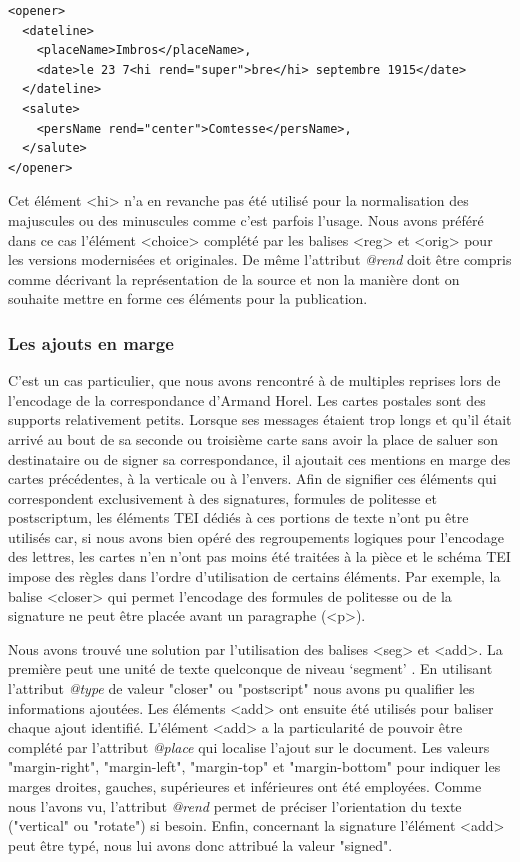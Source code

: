 \documentclass[12pt,a4paper]{book} %
\begin{document}
\begin{lstlisting}
<opener>
  <dateline>
    <placeName>Imbros</placeName>,
    <date>le 23 7<hi rend="super">bre</hi> septembre 1915</date>
  </dateline>
  <salute>
    <persName rend="center">Comtesse</persName>,
  </salute>
</opener>
\end{lstlisting}
\bigskip

Cet élément <hi> n'a en revanche pas été utilisé pour la normalisation des majuscules ou des minuscules comme c'est parfois l'usage. Nous avons préféré dans ce cas l'élément <choice> complété par les balises <reg> et <orig> pour les versions modernisées et originales. De même l'attribut \textit{@rend} doit être compris comme décrivant la représentation de la source et non la manière dont on souhaite  mettre en forme ces éléments pour la publication.

\subsubsection{Les ajouts en marge}

C'est un cas particulier, que nous avons rencontré à de multiples reprises lors de l'encodage de la correspondance d'Armand Horel. Les cartes postales sont des supports relativement petits. Lorsque ses messages étaient trop longs et qu'il était arrivé au bout de sa seconde ou troisième carte sans avoir la place de saluer son destinataire ou de signer sa correspondance, il ajoutait ces mentions en marge des cartes précédentes, à la verticale ou à l'envers. Afin de signifier ces éléments qui correspondent exclusivement à des signatures, formules de politesse et postscriptum, les éléments TEI dédiés à ces portions de texte n'ont pu être utilisés car, si nous avons bien opéré des regroupements logiques pour l'encodage des lettres, les cartes n'en n'ont pas moins été traitées à la pièce et le schéma TEI impose des règles dans l'ordre d'utilisation de certains éléments. Par exemple, la balise <closer> qui permet l'encodage des formules de politesse ou de la signature ne peut être placée avant un paragraphe (<p>). 

Nous avons trouvé une solution par l'utilisation des balises <seg> et <add>.
La première peut \og [contenir] une unité de texte quelconque de niveau ‘segment’ \fg{}. En utilisant l'attribut \textit{@type} de valeur "closer" ou "postscript" nous avons pu qualifier les informations ajoutées. Les éléments <add> ont ensuite été utilisés pour baliser chaque ajout identifié. L'élément <add> a la particularité de pouvoir être complété par l'attribut \textit{@place} qui localise l'ajout sur le document. Les valeurs "margin-right", "margin-left", "margin-top" et "margin-bottom" pour indiquer les marges droites, gauches, supérieures et inférieures ont été employées. Comme nous l'avons vu, l'attribut \textit{@rend} permet de préciser l'orientation du texte ("vertical" ou "rotate") si besoin.
Enfin, concernant la signature l'élément <add> peut être typé, nous lui avons donc attribué la valeur "signed".
\bigskip
\end{document}
